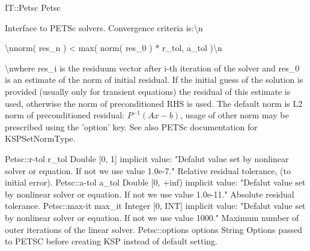 \begin{RecordType}
	{IT::Petsc}
	{Petsc}
	{}%
	{}%
	{{{Interface to PETSc solvers.
Convergence criteria is:{\textbackslash}n}\begin{ttfamily}{\textbackslash}nnorm( res{\_}n )  {\textless} max( norm( res{\_}0 ) * r{\_}tol, a{\_}tol ){\textbackslash}n\end{ttfamily}{{\textbackslash}nwhere res{\_}i is the residuum vector after i-th iteration of the solver and res{\_}0 is an estimate of the norm of initial residual.
If the initial guess of the solution is provided (usually only for transient equations) the residual of this estimate is used, otherwise the norm of preconditioned RHS is used.
The default norm is L2 norm of preconditioned residual: }{$ P^{-1}(Ax-b)$}{, usage of other norm may be prescribed using the 'option' key.
See also PETSc documentation for KSPSetNormType.}%
}}
		\RecKey
			{Petsc::r-tol}
			{r{\_}tol}
			{{Double [0, 1]}}{}
			{implicit value: "{Defalut value set by nonlinear solver or equation. If not we use value 1.0e-7.}"}
			{{{Relative residual tolerance,  (to initial error).}%
}}
		\RecKey
			{Petsc::a-tol}
			{a{\_}tol}
			{{Double [0, +inf)}}{}
			{implicit value: "{Defalut value set by nonlinear solver or equation. If not we use value 1.0e-11.}"}
			{{{Absolute residual tolerance.}%
}}
		\RecKey
			{Petsc::max-it}
			{max{\_}it}
			{{Integer [0, INT]}}{}
			{implicit value: "{Defalut value set by nonlinear solver or equation. If not we use value 1000.}"}
			{{{Maximum number of outer iterations of the linear solver.}%
}}
		\RecKey
			{Petsc::options}
			{options}
			{{String}}{}
			{ }
			{{{Options passed to PETSC before creating KSP instead of default setting.}%
}}
\end{RecordType}
